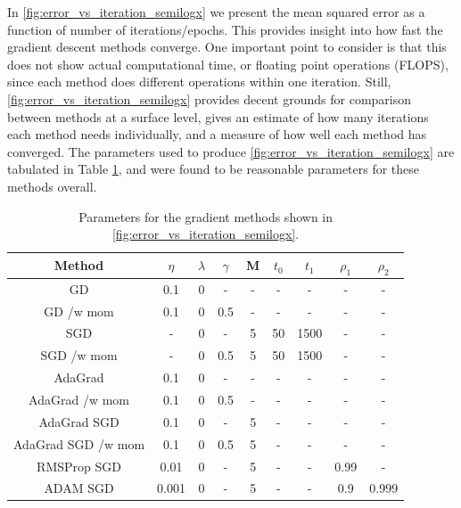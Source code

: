 \documentclass[12pt]{article}
\begin{document}
In \autoref{fig:error_vs_iteration_semilogx} we present the mean squared error as a function of number of iterations/epochs. This provides insight into how fast the gradient descent methods converge. One important point to consider is that this does not show actual computational time, or floating point operations (FLOPS), since each method does different operations within one iteration. Still, \autoref{fig:error_vs_iteration_semilogx} provides decent grounds for comparison between methods at a surface level, gives an estimate of how many iterations each method needs individually, and a measure of how well each method has converged. The parameters used to produce \autoref{fig:error_vs_iteration_semilogx} are tabulated in Table \ref{tab:GD_params}, and were found to be reasonable parameters for these methods overall. 

\begin{table}
    \centering
    \caption{Parameters for the gradient methods shown in \autoref{fig:error_vs_iteration_semilogx}.}
    \begin{center}
    \begin{tabular}{ |c|c c c c c c c c| } 
    \hline
    Method & $\eta$ & $\lambda$ & $\gamma$ & M & $t_0$ & $t_1$ & $\rho_1$ & $\rho_2$ \\
    \hline
    GD & 0.1 & 0 & - & - & - & - & - & -\\ 
    GD /w mom & 0.1 & 0 & 0.5 & - & - & - & -& -\\
    SGD & - & 0 & - & 5 & 50 & 1500 & -& - \\
    SGD /w mom & - & 0 & 0.5 & 5 & 50 & 1500 & -& -\\ 
    AdaGrad & 0.1 & 0 & - & - & - & - & -& -\\
    AdaGrad /w mom & 0.1 & 0 & 0.5 & - & - & - & -& -\\
    AdaGrad SGD & 0.1 & 0 & - & 5 & - & -& -& -\\ 
    AdaGrad SGD /w mom & 0.1 & 0 & 0.5 & 5 & - & - & -& -\\
    RMSProp SGD & 0.01 & 0 & - & 5 & - & - & 0.99 & -\\
    ADAM SGD & 0.001 & 0 & - & 5 & - & - & 0.9 & 0.999\\
    \hline
    \end{tabular}
    \end{center}
    \label{tab:GD_params}
\end{table}
\end{document}
